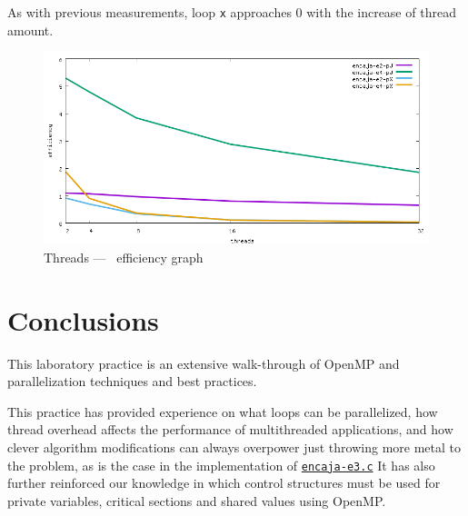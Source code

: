 \documentclass[a4paper]{article}
\newcommand{\github}{https://github.com/kauron/etsinf3/tree/master/CPA/lab2}
\newcommand{\gitline}[2]{\texttt{\href{\github /src/#1#2}{#1}}}
\begin{document}
As with previous measurements, loop \texttt{x} approaches 0 with the increase of thread amount.

\begin{figure}[h]
    \centering
    \includegraphics[width=\textwidth]{../img/efficiency}
    \caption{Threads --- \unskip \, efficiency graph}
    \label{fig:graph-efficiency}
\end{figure}
\newpage

\section{Conclusions}
This laboratory practice is an extensive walk-through of OpenMP and parallelization techniques and best practices.

This practice has provided experience on what loops can be parallelized, how thread overhead affects the performance of multithreaded applications, and how clever algorithm modifications can always overpower just throwing more metal to the problem, as is the case in the implementation of \gitline{encaja-e3.c}. It has also further reinforced our knowledge in which control structures must be used for private variables, critical sections and shared values using OpenMP.
\end{document}
